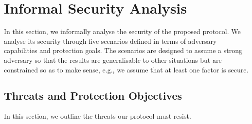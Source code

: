 
\vspace{-1mm}
\section{Informal Security Analysis}
\label{sec:security}

In this section, we informally analyse the security of the proposed protocol. We analyse its security through five scenarios defined in terms of adversary capabilities and protection goals.
The scenarios are designed to assume a strong adversary so that the results are generalisable to other situations but are constrained so as to make sense, e.g., we assume that at least one factor is secure.


\vspace{-1mm}
\subsection{Threats and Protection Objectives}

In this section, we outline the threats our protocol must resist. 



